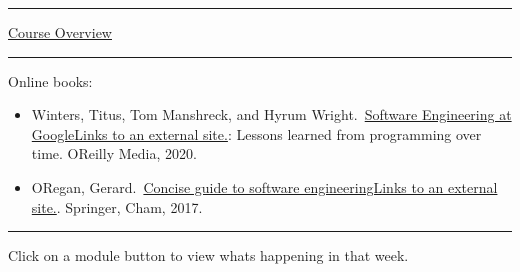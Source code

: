 \documentclass[
]{article}
\providecommand{\tightlist}{%
  \setlength{\itemsep}{0pt}\setlength{\parskip}{0pt}}
\begin{document}
\begin{center}\rule{0.5\linewidth}{0.5pt}\end{center}

\href{https://instructure.charlotte.edu/courses/264138/files/33808309/preview}{Course
Overview}

\begin{center}\rule{0.5\linewidth}{0.5pt}\end{center}

Online books:

\begin{itemize}
\tightlist
\item
  Winters, Titus, Tom Manshreck, and Hyrum
  Wright.~\href{https://abseil.io/resources/swe-book}{Software
  Engineering at GoogleLinks to an external site.}: Lessons learned from
  programming over time. O\textquotesingle Reilly Media, 2020.
\item
  O\textquotesingle Regan,
  Gerard.~\href{https://link.springer.com/content/pdf/10.1007/978-3-319-57750-0.pdf}{Concise
  guide to software engineeringLinks to an external site.}. Springer,
  Cham, 2017.
\end{itemize}

\begin{center}\rule{0.5\linewidth}{0.5pt}\end{center}

Click on a module button to view what\textquotesingle s happening in
that week.
\end{document}

